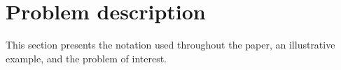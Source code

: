 \documentclass[letterpaper, 10 pt, conference]{ieeeconf}
\begin{document}
%




\section{Problem description}
\label{sec:sec2}

This section presents the notation used throughout the paper, an illustrative example, and the problem of interest.
\end{document}
